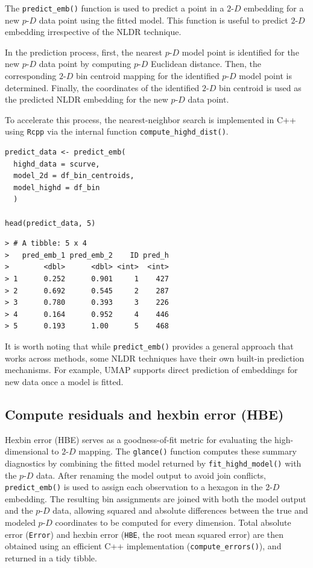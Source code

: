 The \texttt{predict\_emb()} function is used to predict a point in a \(2\text{-}D\) embedding for a new \(p\text{-}D\) data point using the fitted model. This function is useful to predict \(2\text{-}D\) embedding irrespective of the NLDR technique.

In the prediction process, first, the nearest \(p\text{-}D\) model point is identified for the new \(p\text{-}D\) data point by computing \(p\text{-}D\) Euclidean distance. Then, the corresponding \(2\text{-}D\) bin centroid mapping for the identified \(p\text{-}D\) model point is determined. Finally, the coordinates of the identified \(2\text{-}D\) bin centroid is used as the predicted NLDR embedding for the new \(p\text{-}D\) data point.

To accelerate this process, the nearest-neighbor search is implemented in C++ using \texttt{Rcpp} via the internal function \texttt{compute\_highd\_dist()}.

\begin{verbatim}
predict_data <- predict_emb(
  highd_data = scurve, 
  model_2d = df_bin_centroids, 
  model_highd = df_bin
  )

head(predict_data, 5)
\end{verbatim}

\begin{verbatim}
> # A tibble: 5 x 4
>   pred_emb_1 pred_emb_2    ID pred_h
>        <dbl>      <dbl> <int>  <int>
> 1      0.252      0.901     1    427
> 2      0.692      0.545     2    287
> 3      0.780      0.393     3    226
> 4      0.164      0.952     4    446
> 5      0.193      1.00      5    468
\end{verbatim}

It is worth noting that while \texttt{predict\_emb()} provides a general approach that works across methods, some NLDR techniques have their own built-in prediction mechanisms. For example, UMAP \citep{tomasz2023} supports direct prediction of embeddings for new data once a model is fitted.

\subsection{Compute residuals and hexbin error (HBE)}\label{compute-residuals-and-hexbin-error-hbe}

Hexbin error (HBE) serves as a goodness-of-fit metric for evaluating the high-dimensional to \(2\text{-}D\) mapping. The \texttt{glance()} function computes these summary diagnostics by combining the fitted model returned by \texttt{fit\_highd\_model()} with the \(p\text{-}D\) data. After renaming the model output to avoid join conflicts, \texttt{predict\_emb()} is used to assign each observation to a hexagon in the \(2\text{-}D\) embedding. The resulting bin assignments are joined with both the model output and the \(p\text{-}D\) data, allowing squared and absolute differences between the true and modeled \(p\text{-}D\) coordinates to be computed for every dimension. Total absolute error (\texttt{Error}) and hexbin error (\texttt{HBE}, the root mean squared error) are then obtained using an efficient C++ implementation (\texttt{compute\_errors()}), and returned in a tidy tibble.

